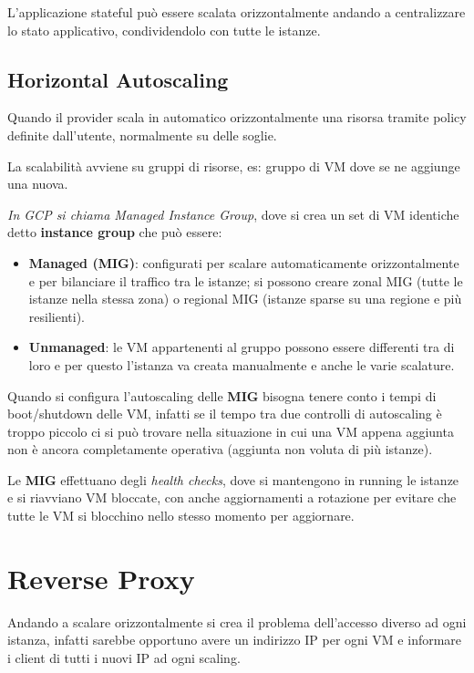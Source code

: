 L'applicazione stateful può essere scalata orizzontalmente andando a
centralizzare lo stato applicativo, condividendolo con tutte le istanze.

\subsection{Horizontal Autoscaling}\label{horizontal-autoscaling}

Quando il provider scala in automatico orizzontalmente una risorsa
tramite policy definite dall'utente, normalmente su delle soglie.

La scalabilità avviene su gruppi di risorse, es: gruppo di VM dove se ne
aggiunge una nuova.

\emph{In GCP si chiama Managed Instance Group}, dove si crea un set di
VM identiche detto \textbf{instance group} che può essere:

\begin{itemize}
\item
  \textbf{Managed (MIG)}: configurati per scalare automaticamente
  orizzontalmente e per bilanciare il traffico tra le istanze; si
  possono creare zonal MIG (tutte le istanze nella stessa zona) o
  regional MIG (istanze sparse su una regione e più resilienti).
\item
  \textbf{Unmanaged}: le VM appartenenti al gruppo possono essere
  differenti tra di loro e per questo l'istanza va creata manualmente e
  anche le varie scalature.
\end{itemize}

Quando si configura l'autoscaling delle \textbf{MIG} bisogna tenere
conto i tempi di boot/shutdown delle VM, infatti se il tempo tra due
controlli di autoscaling è troppo piccolo ci si può trovare nella
situazione in cui una VM appena aggiunta non è ancora completamente
operativa (aggiunta non voluta di più istanze).

Le \textbf{MIG} effettuano degli \emph{health checks}, dove si
mantengono in running le istanze e si riavviano VM bloccate, con anche
aggiornamenti a rotazione per evitare che tutte le VM si blocchino nello
stesso momento per aggiornare.

\section{Reverse Proxy}\label{reverse-proxy}

Andando a scalare orizzontalmente si crea il problema dell'accesso
diverso ad ogni istanza, infatti sarebbe opportuno avere un indirizzo IP
per ogni VM e informare i client di tutti i nuovi IP ad ogni scaling.

